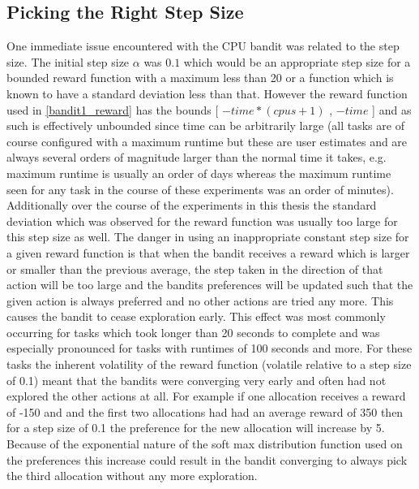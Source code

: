 \subsection{Picking the Right Step Size}
\label{sub:const_stepsize}
One immediate issue encountered with the CPU bandit was related to the step size. The initial step size $\alpha$ was $0.1$ which would be an appropriate step size for a bounded reward function with a maximum less than 20 or a function which is known to have a standard deviation less than that. However the reward function used in \ref{bandit1_reward} has the bounds [ $-time*(cpus+1)$ , $-time$ ] and as such is effectively unbounded since time can be arbitrarily large (all tasks are of course configured with a maximum runtime but these are user estimates and are always several orders of magnitude larger than the normal time it takes, e.g. maximum runtime is usually an order of days whereas the maximum runtime seen for any task in the course of these experiments was an order of minutes). Additionally over the course of the experiments in this thesis the standard deviation which was observed for the reward function was usually too large for this step size as well.  The danger in using an inappropriate constant step size for a given reward function is that when the bandit receives a reward which is larger or smaller than the previous average, the step taken in the direction of that action will be too large and the bandits preferences will be updated such that the given action is always preferred and no other actions are tried any more. This causes the bandit to cease exploration early. This effect was most commonly occurring for tasks which took longer than 20 seconds to complete and was especially pronounced for tasks with runtimes of 100 seconds and more.  For these tasks the inherent volatility of the reward function (volatile relative to a step size of 0.1) meant that the bandits were converging very early and often had not explored the other actions at all. For example if one allocation receives a reward of -150 and and the first two allocations had had an average reward of 350 then for a step size of 0.1 the preference for the new allocation will increase by 5. Because of the exponential nature of the soft max distribution function used on the preferences this increase could result in the bandit converging to always pick the third allocation without any more exploration. 


